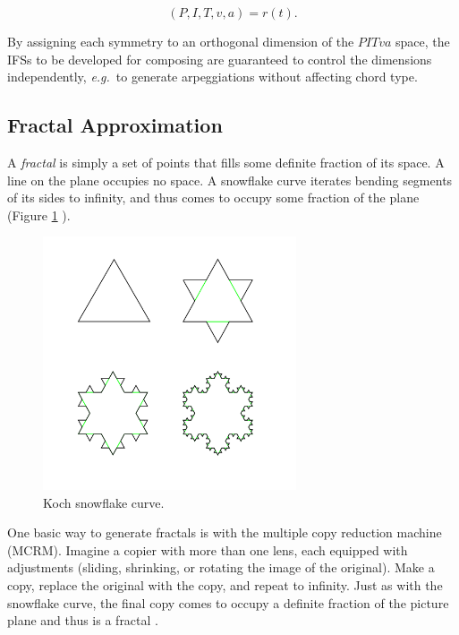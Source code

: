 \documentclass[english,11pt,letterpaper,onecolumn]{scrartcl}
\numberwithin{equation}{section}
\begin{document}
$$(P, I, T, v, a) = r(t).$$

By assigning each symmetry to an orthogonal dimension of the $PITva$ space, the
IFSs to be developed for composing are guaranteed to control the dimensions
independently, \textit{e.g.}\ to generate arpeggiations without affecting
chord type.

\subsection{Fractal Approximation}

A \textit{fractal} is simply a set of points that fills some definite fraction
of its space. A line on the plane occupies no space. A snowflake curve
iterates bending segments of its sides to infinity, and thus comes to occupy
some fraction of the plane (Figure \ref{fig:kochflake}
\cite{Mandelbrot:1982:FGN}).

\begin{figure}
\centerline{\includegraphics[width = 0.6667\textwidth]{KochFlake}}
\caption{\label{fig:kochflake} Koch snowflake
curve.\protect\footnotemark}
\end{figure}


One basic way to generate fractals is with the multiple copy reduction
machine (MCRM). Imagine a copier with more than one lens, each equipped with
adjustments (sliding, shrinking, or rotating the image of the original). Make
a copy, replace the original with the copy, and repeat to infinity. Just as
with the snowflake curve, the final copy comes to occupy a definite fraction
of the picture plane and thus is a fractal \cite{chaosandfractals}.
\end{document}
